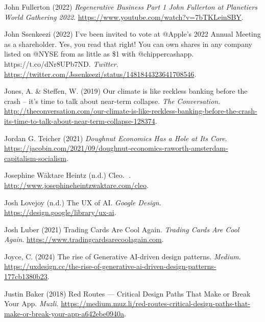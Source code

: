 \documentclass[
  letterpaper,
  DIV=11,
  numbers=noendperiod]{scrartcl}
\newlength{\cslhangindent}
\newenvironment{CSLReferences}[2] %
 {\begin{list}{}{%
  \setlength{\itemindent}{0pt}
  \setlength{\leftmargin}{0pt}
  \setlength{\parsep}{0pt}
  \ifodd #1
   \setlength{\leftmargin}{\cslhangindent}
   \setlength{\itemindent}{-1\cslhangindent}
  \fi
  \setlength{\itemsep}{#2\baselineskip}}}
 {\end{list}}
\begin{document}
\begin{CSLReferences}{0}{1}
John Fullerton (2022) \emph{Regenerative {Business Part} 1 {\textbar}
{John Fullerton} at {Planetiers World Gathering} 2022}.
\url{https://www.youtube.com/watch?v=7bTKLeinSBY}.

John Ssenkeezi (2022) I've been invited to vote at @{Apple}'s 2022
{Annual Meeting} as a shareholder. {Yes}, you read that right! {You} can
own shares in any company listed on @{NYSE} from as little as \$1 with
@chippercashapp. {https://t.co/dNr8UPb7ND}. \emph{Twitter}.
\url{https://twitter.com/Jssenkeezi/status/1481844323641708546}.

Jones, A. \& Steffen, W. (2019) Our climate is like reckless banking
before the crash -- it's time to talk about near-term collapse.
\emph{The Conversation}.
\url{http://theconversation.com/our-climate-is-like-reckless-banking-before-the-crash-its-time-to-talk-about-near-term-collapse-128374}.

Jordan G. Teicher (2021) \emph{Doughnut {Economics Has} a {Hole} at {Its
Core}}.
\url{https://jacobin.com/2021/09/doughnut-economics-raworth-amsterdam-capitalism-socialism}.

Josephine Wäktare Heintz (n.d.) Cleo. \emph{👀}.
\url{http://www.josephineheintzwaktare.com/cleo}.

Josh Lovejoy (n.d.) The {UX} of {AI}. \emph{Google Design}.
\url{https://design.google/library/ux-ai}.

Josh Luber (2021) Trading {Cards Are Cool Again}. \emph{Trading Cards
Are Cool Again}. \url{https://www.tradingcardsarecoolagain.com}.

Joyce, C. (2024) The rise of {Generative AI-driven} design patterns.
\emph{Medium}.
\url{https://uxdesign.cc/the-rise-of-generative-ai-driven-design-patterns-177cb1380b23}.

Justin Baker (2018) Red {Routes} --- {Critical Design Paths That Make}
or {Break Your App}. \emph{Muzli}.
\url{https://medium.muz.li/red-routes-critical-design-paths-that-make-or-break-your-app-a642ebe0940a}.


\end{CSLReferences}
\end{document}
